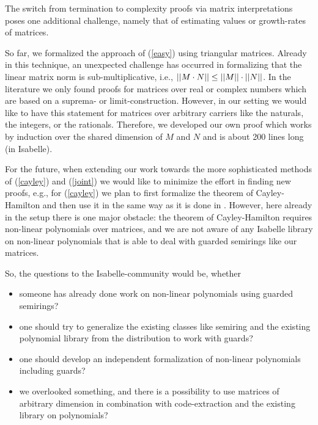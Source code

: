 \documentclass[a4paper]{llncs}
\newcommand{\rSub}[1]{(\ref{#1})}
\begin{document}
The switch from termination to complexity proofs via matrix interpretations
poses one additional challenge, namely that of estimating values or
growth-rates of matrices. 

So far, we formalized the approach of \rSub{easy}
using triangular matrices. 
Already in this technique, an unexpected challenge has occurred in formalizing that 
the linear matrix norm is sub-multiplicative, i.e., $||M \cdot N|| \leq
||M|| \cdot ||N||$. In the literature we only found proofs for matrices
over real or
complex numbers which are based on a suprema- or limit-construction. However, in our setting
we would like to have this statement for matrices over arbitrary carriers
like the
naturals, the integers, or the rationals. Therefore, we developed our own proof
which works by induction over the shared dimension of $M$ and $N$ and is about
200 lines long (in Isabelle).

For the future, when extending our work towards the more sophisticated methods
of \rSub{cayley} and \rSub{joint} we would like to minimize the effort in finding
new proofs, e.g., for \rSub{cayley} we plan to first formalize the theorem
of Cayley-Hamilton and then use it in the same way as it is done in \cite{NZM10}.
 However, here already in the setup there is one major obstacle:
the theorem of Cayley-Hamilton requires non-linear polynomials over
  matrices, and we are not aware of any Isabelle library on 
  non-linear polynomials
  that is able to deal with guarded semirings like our matrices.
  
So, the questions to the Isabelle-community would be, whether
\begin{itemize}
\item someone has already done work on non-linear polynomials using guarded semirings?
\item one should try to generalize the existing classes like semiring 
  and the existing polynomial library from the
  distribution to work with guards?
\item one should develop an independent formalization
  of non-linear polynomials including guards?
\item we overlooked something, and there is a possibility to use matrices
  of arbitrary dimension in combination with code-extraction and 
  the existing library on
  polynomials?
\end{itemize}






\end{document}
